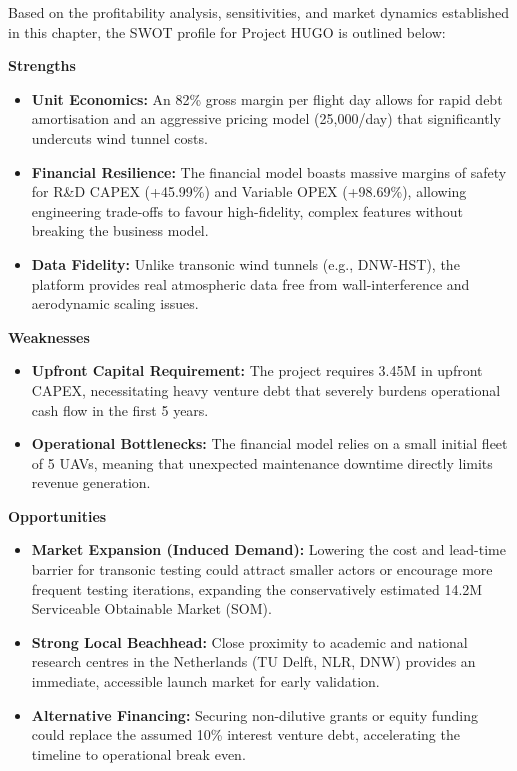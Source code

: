 Based on the profitability analysis, sensitivities, and market dynamics established in this chapter, the SWOT profile for Project HUGO is outlined below:

\noindent\textbf{Strengths}
\begin{itemize}
    \item \textbf{Unit Economics:} An 82\% gross margin per flight day allows for rapid debt amortisation and an aggressive pricing model (\texteuro{}25,000/day) that significantly undercuts wind tunnel costs.
    \item \textbf{Financial Resilience:} The financial model boasts massive margins of safety for R\&D CAPEX (+45.99\%) and Variable OPEX (+98.69\%), allowing engineering trade-offs to favour high-fidelity, complex features without breaking the business model.
    \item \textbf{Data Fidelity:} Unlike transonic wind tunnels (e.g., DNW-HST), the platform provides real atmospheric data free from wall-interference and aerodynamic scaling issues.
\end{itemize}

\noindent\textbf{Weaknesses}
\begin{itemize}
    \item \textbf{Upfront Capital Requirement:} The project requires \texteuro{}3.45M in upfront CAPEX, necessitating heavy venture debt that severely burdens operational cash flow in the first 5 years.
    \item \textbf{Operational Bottlenecks:} The financial model relies on a small initial fleet of 5 UAVs, meaning that unexpected maintenance downtime directly limits revenue generation.
\end{itemize}

\noindent\textbf{Opportunities}
\begin{itemize}
    \item \textbf{Market Expansion (Induced Demand):} Lowering the cost and lead-time barrier for transonic testing could attract smaller actors or encourage more frequent testing iterations, expanding the conservatively estimated \texteuro{}14.2M Serviceable Obtainable Market (SOM).
    \item \textbf{Strong Local Beachhead:} Close proximity to academic and national research centres in the Netherlands (TU Delft, NLR, DNW) provides an immediate, accessible launch market for early validation.
    \item \textbf{Alternative Financing:} Securing non-dilutive grants or equity funding could replace the assumed 10\% interest venture debt, accelerating the timeline to operational break even.
\end{itemize}

